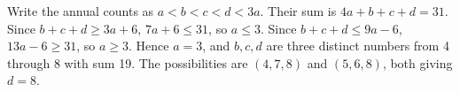 Write the annual counts as $a<b<c<d<3a$. Their sum is $4a+b+c+d=31$. Since $b+c+d\ge3a+6$, $7a+6\le31$, so $a\le3$. Since $b+c+d\le9a-6$, $13a-6\ge31$, so $a\ge3$. Hence $a=3$, and $b,c,d$ are three distinct numbers from 4 through 8 with sum 19. The possibilities are $(4,7,8)$ and $(5,6,8)$, both giving $\boxed{d=8}$.

